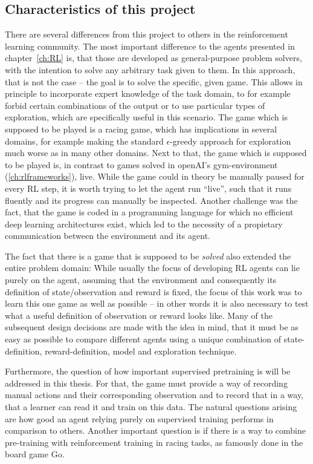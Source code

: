 \subsection{Characteristics of this project} \label{ch:projectcharacteristics}

There are several differences from this project to others in the reinforcement learning community. The most important difference to the agents presented in chapter~\ref{ch:RL} is, that those are developed as general-purpose problem solvers, with the intention to solve any arbitrary task given to them. In this approach, that is not the case -- the goal is to solve the specific, given game. This allows in principle to incorporate expert knowledge of the task domain, to for example forbid certain combinations of the output or to use particular types of exploration, which are specifically useful in this scenario. The game which is supposed to be played is a racing game, which has implications in several domains, for example making the standard $\epsilon$-greedy approach for exploration much worse as in many other domains. Next to that, the game which is supposed to be played is, in contrast to games solved in openAI's gym-environment (\ref{ch:rlframeworks}), live. While the game could in theory be manually paused for every RL step, it is worth trying to let the agent run ``live'', such that it runs fluently and its progress can manually be inspected. Another challenge was the fact, that the game is coded in a programming language for which no efficient deep learning architectures exist, which led to the necessity of a propietary communication between the environment and its agent.

The fact that there is a game that is supposed to be \textit{solved} also extended the entire problem domain: While usually the focus of developing RL agents can lie purely on the agent, assuming that the environment and consequently its definition of state/observation and reward is fixed, the focus of this work was to learn this one game as well as possible -- in other words it is also necessary to test what a useful definition of observation or reward looks like. Many of the subsequent design decisions are made with the idea in mind, that it must be as easy as possible to compare different agents using a unique combination of state-definition, reward-definition, model and exploration technique. 

Furthermore, the question of how important supervised pretraining is will be addressed in this thesis. For that, the game must provide a way of recording manual actions and their corresponding observation and to record that in a way, that a learner can read it and train on this data. The natural questions arising are how good an agent relying purely on supervised training performs in comparison to others. Another important question is if there is a way to combine pre-training with reinforcement training in racing tasks, as famously done in the board game Go\cite{silver_mastering_2016}.

